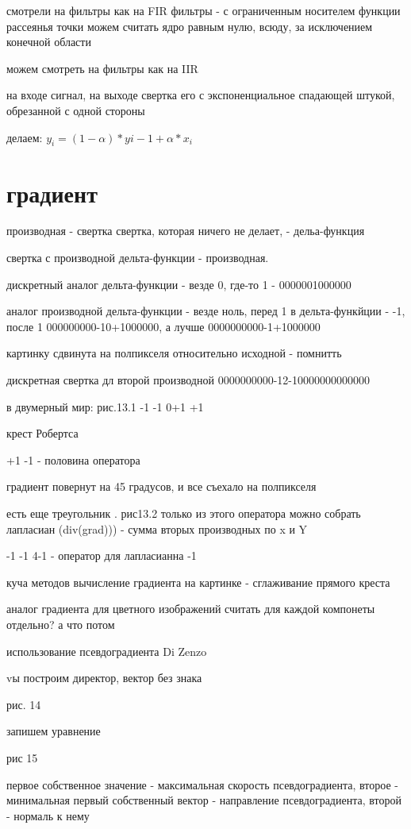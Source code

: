 \documentclass[]{report}
\begin{document}
смотрели на фильтры как на FIR фильтры - с ограниченным носителем функции рассеянья точки
можем считать ядро равным нулю, всюду, за исключением конечной области

можем смотреть на фильтры как на IIR

на входе сигнал, на выходе свертка его с экспоненциальное спадающей штукой, обрезанной с одной стороны

делаем:
$y_i=(1-\alpha)*y{i-1}+\alpha*x_i$

\section{градиент}
производная - свертка
свертка, которая ничего не делает, - дельа-функция

свертка с производной дельта-функции - производная.

дискретный аналог дельта-функции - везде 0, где-то 1 - 0000001000000

аналог производной дельта-функции - везде ноль, перед 1 в дельта-функйции - -1, после 1
000000000-10+1000000, а лучше 0000000000-1+1000000

картинку сдвинута на полпикселя относительно исходной - помнитть


дискретная свертка дл второй производной 
0000000000-12-10000000000000

в двумерный мир:
рис.13.1
   -1
 -1 0+1 
   +1
   
крест Робертса

  +1
-1    - половина оператора

градиент повернут на 45 градусов, и все съехало на полпикселя

есть еще треугольник . рис13.2
только из этого оператора можно собрать лапласиан (div(grad))) - сумма вторых производных по x и Y

  -1
-1 4-1  - оператор для лапласианна
  -1

куча методов вычисление градиента на картинке - сглаживание прямого креста


аналог градиента для цветного изображений
считать для каждой компонеты отдельно? а что потом

использование псевдоградиента Di Zenzo

vы построим директор, вектор без знака

рис. 14

запишем уравнение

рис 15

первое собственное значение - максимальная скорость псевдоградиента, второе - минимальная
первый собственный вектор - направление псевдоградиента, второй - нормаль к нему
\end{document}
